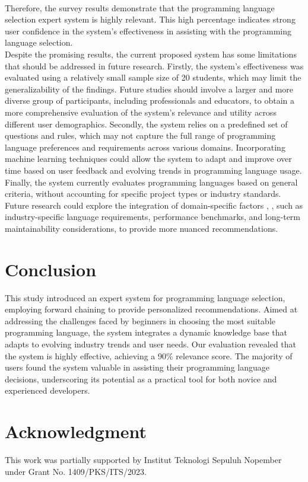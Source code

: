 \documentclass[conference]{IEEEtran}
\begin{document}
\\
\indent Therefore, the survey results demonstrate that the programming language selection expert system is highly relevant. This high percentage indicates strong user confidence in the system’s effectiveness in assisting with the programming language selection.
\\
\indent Despite the promising results, the current proposed system has some limitations that should be addressed in future research. Firstly, the system’s effectiveness was evaluated using a relatively small sample size of 20 students, which may limit the generalizability of the findings. Future studies should involve a larger and more diverse group of participants, including professionals and educators, to obtain a more comprehensive evaluation of the system’s relevance and utility across different user demographics. Secondly, the system relies on a predefined set of questions and rules, which may not capture the full range of programming language preferences and requirements across various domains. Incorporating machine learning techniques could allow the system to adapt and improve over time based on user feedback and evolving trends in programming language usage. Finally, the system currently evaluates programming languages based on general criteria, without accounting for specific project types or industry standards. Future research could explore the integration of domain-specific factors \cite{Thang2016}, \cite{Takayanagi2024}, such as industry-specific language requirements, performance benchmarks, and long-term maintainability considerations, to provide more nuanced recommendations.

\section{Conclusion}
This study introduced an expert system for programming language selection, employing forward chaining to provide personalized recommendations. Aimed at addressing the challenges faced by beginners in choosing the most suitable programming language, the system integrates a dynamic knowledge base that adapts to evolving industry trends and user needs. Our evaluation revealed that the system is highly effective, achieving a 90\% relevance score. The majority of users found the system valuable in assisting their programming language decisions, underscoring its potential as a practical tool for both novice and experienced developers.

\section*{Acknowledgment}

This work was partially supported by Institut Teknologi Sepuluh Nopember under Grant No. 1409/PKS/ITS/2023.

\balance %


\end{document}
